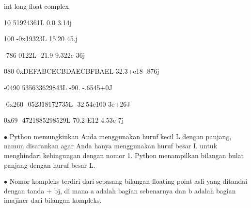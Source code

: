 \vspace{12pt}
int \hspace*{0.5in} long \hspace*{0.5in} float \hspace*{0.5in} complex \par
10 \hspace*{0.5in} 51924361L \hspace*{0.5in} 0.0 \hspace*{0.5in} 3.14j \par
100 \hspace*{0.5in} -0x19323L \hspace*{0.5in} 15.20 \hspace*{0.5in} 45.j \par
-786 \hspace*{0.5in} 0122L \hspace*{0.5in} -21.9 \hspace*{0.5in} 9.322e-36j \par
080 \hspace*{0.5in} 0xDEFABCECBDAECBFBAEL \hspace*{0.5in} 32.3+e18 \hspace*{0.5in} .876j \par
-0490 \hspace*{0.5in} 535633629843L \hspace*{0.5in} -90. \hspace*{0.5in} -.6545+0J \par
-0x260 \hspace*{0.5in} -052318172735L \hspace*{0.5in} -32.54e100 \hspace*{0.5in} 3e+26J \par
0x69 \hspace*{0.5in} -4721885298529L \hspace*{0.5in} 70.2-E12 \hspace*{0.5in} 4.53e-7j \par
 $ \bullet $ Python memungkinkan Anda menggunakan huruf kecil L dengan panjang, namun disarankan agar Anda hanya menggunakan huruf besar L untuk menghindari kebingungan dengan nomor 1. Python menampilkan bilangan bulat panjang dengan huruf besar L. \par
 $ \bullet $ Nomor kompleks terdiri dari sepasang bilangan floating point asli yang ditandai dengan tanda + bj, di mana a adalah bagian sebenarnya dan b adalah bagian imajiner dari bilangan kompleks. \par
\vspace{12pt}
